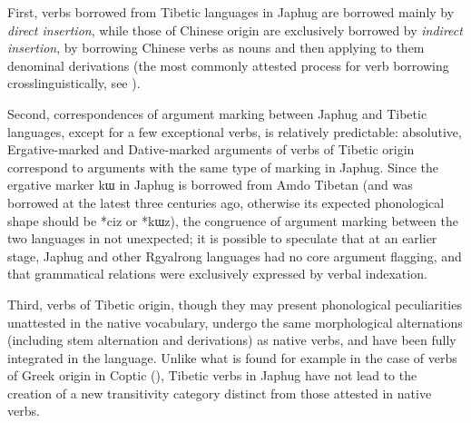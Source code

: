 \documentclass[oldfontcommands,oneside,a4paper,11pt]{article}
\newcommand{\ipa}[1]{{\phon \mbox{#1}}} %
\begin{document}
First, verbs borrowed from Tibetic languages in Japhug are borrowed mainly by \textit{direct insertion}, while those of Chinese origin are exclusively borrowed by \textit{indirect insertion}, by borrowing Chinese verbs as nouns and then applying to them denominal derivations (the most commonly attested process for verb borrowing crosslinguistically, see \citealt{wohlgemuth09verbal}). 

Second, correspondences of argument marking between Japhug and Tibetic languages, except for a few exceptional verbs, is relatively predictable: absolutive, Ergative-marked and Dative-marked arguments of verbs of Tibetic origin correspond to arguments with the same type of marking in Japhug. Since the ergative marker \ipa{kɯ} in Japhug is borrowed from Amdo Tibetan (and was borrowed at the latest three centuries ago, otherwise its expected phonological shape should be *\ipa{ciz} or *\ipa{kɯz}), the congruence of argument marking between the two languages in not unexpected; it is possible to speculate that at an earlier stage, Japhug and other Rgyalrong languages  had no core argument flagging, and that grammatical relations were exclusively expressed by verbal indexation.

Third, verbs of Tibetic origin, though they may present phonological peculiarities unattested in the native vocabulary, undergo the same morphological alternations (including stem alternation and derivations) as native verbs, and have been fully integrated in the language. Unlike what is found for example in the case of verbs of Greek origin in Coptic (\citealt{grossmann16contact}), Tibetic verbs in Japhug have not lead to the creation of a new transitivity category distinct from those attested in native verbs. 




\end{document}
